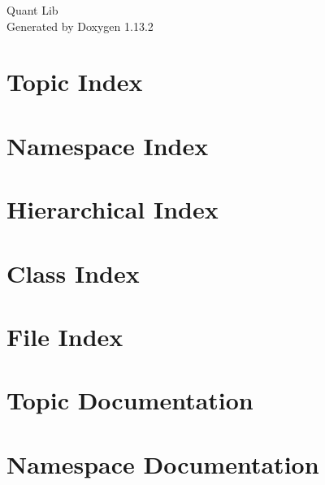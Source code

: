 \documentclass[twoside]{book}
\newcommand{\+}{\discretionary{\mbox{\scriptsize$\hookleftarrow$}}{}{}}
\newcommand{\clearemptydoublepage}{%
    \newpage{\pagestyle{empty}\cleardoublepage}%
  }
\begin{document}
  \raggedbottom
    \hypersetup{pageanchor=false,
                bookmarksnumbered=true,
                pdfencoding=unicode
               }
  \begin{titlepage}
  \vspace*{7cm}
  \begin{center}%
  {\Large Quant Lib}\\
  \vspace*{1cm}
  {\large Generated by Doxygen 1.13.2}\\
  \end{center}
  \end{titlepage}
  \clearemptydoublepage
  \tableofcontents
  \clearemptydoublepage
  \hypersetup{pageanchor=true}




\chapter{Topic Index}

\chapter{Namespace Index}

\chapter{Hierarchical Index}

\chapter{Class Index}

\chapter{File Index}

\chapter{Topic Documentation}


\chapter{Namespace Documentation}




\end{document}
